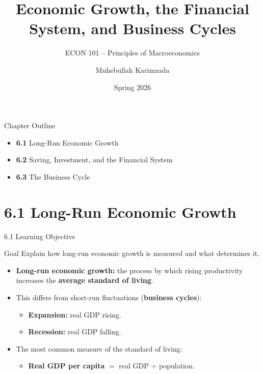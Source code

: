 \documentclass[aspectratio=169]{beamer}
\title{\textbf{Economic Growth, the Financial System, and Business Cycles}}
\subtitle{{\large ECON 101 -- Principles of Macroeconomics}}
\author{Muhebullah Karimzada}
\date{Spring 2026}
\begin{document}

\begin{frame}[plain]
  \titlepage
\end{frame}

\begin{frame}{Chapter Outline}
\transfade
\begin{itemize}
  \item \textbf{6.1} Long-Run Economic Growth
  \item \textbf{6.2} Saving, Investment, and the Financial System
  \item \textbf{6.3} The Business Cycle
\end{itemize}
\end{frame}

\section{6.1 Long-Run Economic Growth}

\begin{frame}{6.1 Learning Objective}
\transfade
\begin{block}{Goal}
Explain how long-run economic growth is measured and what determines it.
\end{block}
\begin{itemize}
  \item \textbf{Long-run economic growth:} the process by which rising \alert{productivity} increases the \textbf{average standard of living}.
  \item This differs from short-run fluctuations (\textbf{business cycles}):
  \begin{itemize}
    \item \textbf{Expansion:} real GDP rising.
    \item \textbf{Recession:} real GDP falling.
  \end{itemize}
  \item The most common measure of the standard of living:
  \begin{itemize}
    \item \textbf{Real GDP per capita} $=$ real GDP $\div$ population.
  \end{itemize}
\end{itemize}
\end{frame}
\end{document}
